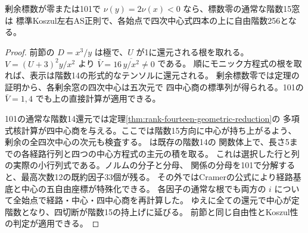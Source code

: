 \begin{corollary}\label{cor:pauli-rank-fourteen-valuation-wall}
剰余標数が零または101で $\nu(y)=2\nu(x)<0$ なら、標数零の通常な階数15窓は
標準Koszul左右AS正則で、各始点で四次中心式四本の上に自由階数256となる。
\end{corollary}
\begin{proof}
前節の $D=x^3/y$ は極で、$U$ が1に還元される根を取れる。
$V=(U+3)^2 y/x^2$ より $\bar V=16\,\overline{y/x^2}\ne0$ である。
順にモニック方程式の根を取れば、表示は階数14の形式的なテンソルに還元される。
剰余標数零では定理の証明から、各剰余窓の四次中心は五次元で
四中心商の標準列が得られる。101の $\bar V=1,4$ でも上の直接計算が適用できる。

101の通常な階数14還元では定理\ref{thm:rank-fourteen-geometric-reduction}の
多項式核計算が四中心商を与える。ここでは階数15方向に中心が持ち上がるよう、
剰余の全四次中心の次元も検査する。
 は既存の階数14の
関数体上で、長さ5までの各経路行列と四つの中心方程式の主元の積を取る。
これは選択した行と列の実際の小行列式である。ノルムの分子と分母、
関係の分母を101で分解すると、最高次数12の既約因子33個が残る。
その外ではCramerの公式により経路基底と中心の五自由座標が特殊化できる。
各因子の通常な根でも両方の $i$ について全始点で経路・中心・四中心商を再計算した。
ゆえに全ての還元で中心が定階数となり、四切断が階数15の持上げに延びる。
前節と同じ自由性とKoszul性の判定が適用できる。
\end{proof}
